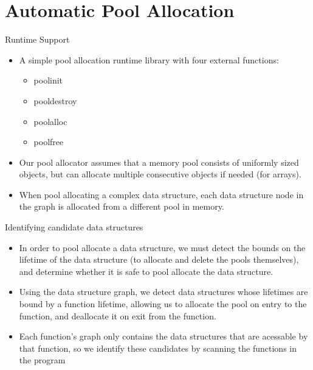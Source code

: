 \documentclass{beamer}
\begin{document}
\section{Automatic Pool Allocation}
\begin{frame}{Runtime Support}
  \begin{itemize}
	  \setlength{\itemsep}{0.5cm}
	\item 
  A simple pool allocation runtime library with four
external functions:
\begin{itemize}
  \item poolinit
	\item pooldestroy
	  \item poolalloc
		\item poolfree
\end{itemize}
\item Our pool allocator assumes that a memory pool consists of uniformly sized objects, but can allocate multiple consecutive objects
if needed (for arrays).
\item When pool allocating a complex data structure, each data structure node in the graph
is allocated from a different pool in memory.
  \end{itemize}
\end{frame}

\begin{frame}{Identifying candidate data structures}
  \begin{itemize}
	  \setlength{\itemsep}{0.5cm}
	\item In order to pool allocate a data structure, we must detect the
bounds on the lifetime of the data structure (to allocate and delete
the pools themselves), and determine whether it is safe to pool 
allocate the data structure.
\item Using the data structure graph, we detect data structures whose
lifetimes are bound by a function lifetime, allowing us to allocate
the pool on entry to the function, and deallocate it on exit from the
function.
\item Each function's graph only contains the
  data structures that are acessable by that function, so we identify these candidates by scanning the functions
in the program
  \end{itemize}
\end{frame}
\end{document}
